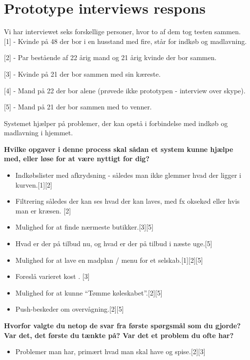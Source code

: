 \chapter{Prototype interviews respons}\label{ch:protorespons}
Vi har interviewet seks forskellige personer, hvor to af dem tog testen sammen.
{[}1{]} - Kvinde på 48 der bor i en husstand med fire, står for indkøb og madlavning.

{[}2{]} - Par bestående af 22 årig mand og 21 årig kvinde der bor sammen.

{[}3{]} - Kvinde på 21 der bor sammen med sin kæreste.

{[}4{]} - Mand på 22 der bor alene (prøvede ikke prototypen - interview over skype).

{[}5{]} - Mand på 21 der bor sammen med to venner.

Systemet hjælper på problemer, der kan opstå i forbindelse med indkøb og madlavning i hjemmet.

\textbf{Hvilke opgaver i denne process skal sådan et system kunne hjælpe med, eller løse for at være nyttigt for dig?}
\begin{itemize}
	\item Indkøbslister med afkrydsning - således man ikke glemmer hvad der ligger i kurven.{[}1{]}{[}2{]}
	\item Filtrering således der kan ses hvad der kan laves, med fx oksekød eller hvis man er kræsen. {[}2{]} 
	\item Mulighed for at finde nærmeste butikker.{[}3{]}{[}5{]}
	\item Hvad er der på tilbud nu, og hvad er der på tilbud i næste uge.{[}5{]}
	\item Mulighed for at lave en madplan / menu for et selskab.{[}1{]}{[}2{]}{[}5{]}
	\item Foreslå varieret kost . {[}3{]}
	\item Mulighed for at kunne “Tømme køleskabet”.{[}2{]}{[}5{]}
	\item Push-beskeder om overvågning.{[}2{]}{[}5{]}
\end{itemize}

\textbf{Hvorfor valgte du netop de svar fra første spørgsmål som du gjorde? Var det, det første
du tænkte på? Var det et problem du ofte har?}
\begin{itemize}
	\item Problemer man har, primært hvad man skal have og spise.{[}2{]}{[}3{]}
\end{itemize}


